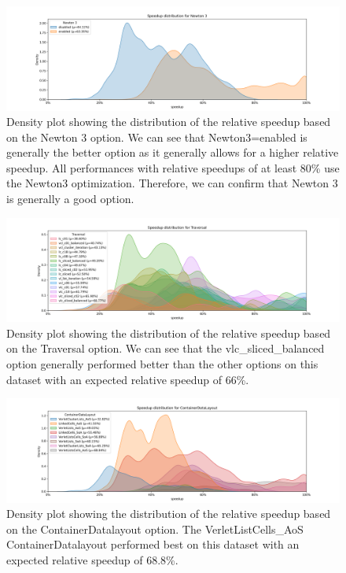 \begin{figure}[H]
  \centering
  \includegraphics[width=\columnwidth,trim={1cm 0 2cm 1.5cm},clip]{figures/DataAnalytics/speedup_Newton 3.png}
  \caption[Speedup density plot based on the Newton 3 option]{Density plot showing the distribution of the relative speedup based on the Newton 3 option. We can see that Newton3=enabled is generally the better option as it generally allows for a higher relative speedup. All performances with relative speedups of at least 80\% use the Newton3 optimization. Therefore, we can confirm that Newton 3 is generally a good option.}
  \label{fig:inputAnalysisDensityNewton3}
\end{figure}

\begin{figure}[H]
  \centering
  \includegraphics[width=\columnwidth,trim={1cm 0 2cm 1.5cm},clip]{figures/DataAnalytics/speedup_Traversal.png}
  \caption[Speedup density plot based on the Traversal option]{Density plot showing the distribution of the relative speedup based on the Traversal option. We can see that the vlc\_sliced\_balanced option generally performed better than the other options on this dataset with an expected relative speedup of 66\%.}
  \label{fig:inputAnalysisDensityTraversal}
\end{figure}

\begin{figure}[H]
  \centering
  \includegraphics[width=\columnwidth,trim={1cm 0 2cm 1.5cm},clip]{figures/DataAnalytics/speedup_ContainerDataLayout.png}
  \caption[Speedup density plot of Configuration-Datalayout option]{Density plot showing the distribution of the relative speedup based on the ContainerDatalayout option. The VerletListCells\_AoS ContainerDatalayout performed best on this dataset with an expected relative speedup of 68.8\%.}
  \label{fig:inputAnalysisDensityDatalayout}
\end{figure}